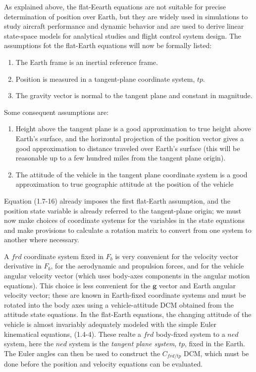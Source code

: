 As explained above, the flat-Eearth equations are not suitable for precise determination of position over Earth, but they are widely used in simulations to study aircraft performance and dynamic behavior and are used to derive linear state-space models for analytical studies and flight control system design. The assumptions fot the flat-Earth equations will now be formally listed:

\begin{enumerate}
    \item The Earth frame is an inertial reference frame.
    \item Position is measured in a tangent-plane coordinate system, \(tp\).
    \item The gravity vector is normal to the tangent plane and constant in magnitude.
\end{enumerate}

Some consequent assumptions are:

\begin{enumerate}
    \item Height above the tangent plane is a good approximation to true height above Earth's surface, and the horizontal projection of the position vector gives a good approximation to distance traveled over Earth's surface (this will be reasonable up to a few hundred miles from the tangent plane origin).
    \item The attitude of the vehicle in the tangent plane coordinate system is a good approximation to true geographic attitude at the position of the vehicle
\end{enumerate}

Equation (1.7-16) already imposes the first flat-Earth assumption, and the position state variable is already referred to the tangent-plane origin; we must now make choices of coordinate systems for the variables in the state equations and make provisions to calculate a rotation matrix to convert from one system to another where necessary.

A \(frd\) coordinate system fixed in  \(F_{b}\) is very convenient for the velocity vector derivative in \(F_{b}\), for the aerodynamic and propulsion forces, and for the vehicle angular velocity vector (which uses body-axes components in the angular motion equations). This choice is less convenient for the \(\mathbf{g}\) vector and Earth angular velocity vector; these are known in Earth-fixed coordinate systems and must be rotated into the body axes using a vehicle-attitude DCM obtained from the attitude state equations. In the flat-Earth equations, the changing attitude of the vehicle is almost invariably adequately modeled with the simple Euler kinematical equations, (1.4-4). These realte a \(frd\) body-fixed system to a \(ned\) system, here the \(ned\) system is the \emph{tangent plane system}, \(tp\), fixed in the Earth. The Euler angles can then be used to construct the \(C_{frd/tp}\) DCM, which must be done before the position and velocity equations can be evaluated.

